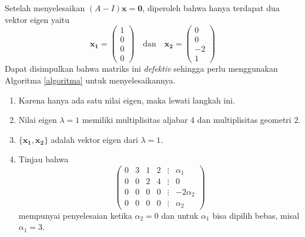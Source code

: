 \documentclass[a4paper]{article}
\theoremstyle{definisi}
\numberwithin{equation}{section}
\begin{document}
\begin{enumerate}
    Setelah menyelesaikan $(A-I)\mathbf{x}=\mathbf{0}$, diperoleh bahwa hanya terdapat dua vektor eigen yaitu
    \begin{equation*}
      \mathbf{x_1}=\begin{pmatrix}
        1\\0\\0\\0
      \end{pmatrix}\quad\text{dan}\quad
      \mathbf{x_2}=\begin{pmatrix}
        0\\0\\-2\\1
      \end{pmatrix}
    \end{equation*}
    Dapat disimpulkan bahwa matriks ini \textit{defektiv} sehingga perlu menggunakan Algoritma \ref{algoritma} untuk menyelesaikannya.
    \begin{enumerate}[label=Langkah \arabic*: ,leftmargin=*]
      \item Karena hanya ada satu nilai eigen, maka lewati langkah ini.
      \item Nilai eigen $\lambda=1$ memiliki multiplisitas aljabar 4 dan multiplisitas geometri 2.
      \item $\{\mathbf{x_1},\mathbf{x_2}\}$ adalah vektor eigen dari $\lambda=1$.
      \item Tinjau bahwa
      \begin{equation*}
        \begin{pmatrix}
          0&3&1&2&\vdots&\alpha_1\\
          0&0&2&4&\vdots&0\\
          0&0&0&0&\vdots&-2\alpha_2\\
          0&0&0&0&\vdots&\alpha_2
        \end{pmatrix}
      \end{equation*}
      mempunyai penyelesaian ketika $\alpha_2=0$ dan untuk $\alpha_1$ bisa dipilih bebas, misal $\alpha_1=3$.


\end{enumerate}
\end{enumerate}
\end{document}
